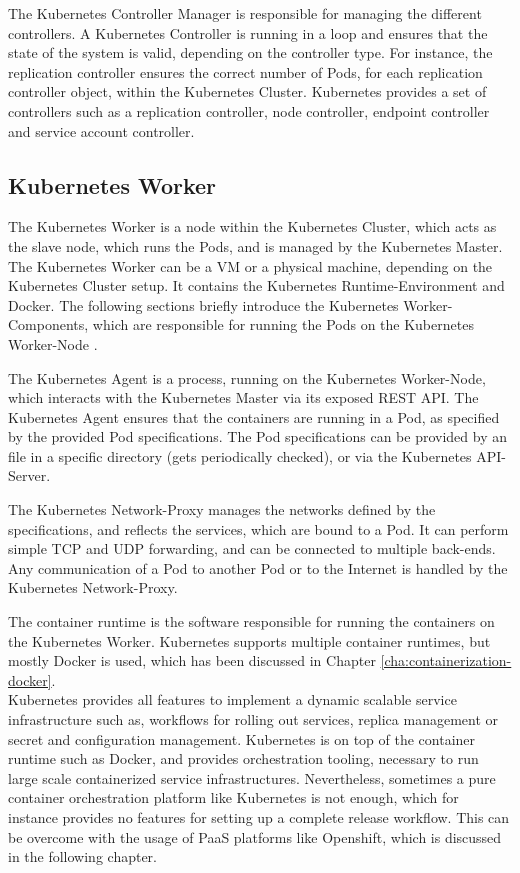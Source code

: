 The Kubernetes Controller Manager is responsible for managing the different controllers. A Kubernetes Controller is running in a loop and ensures that the state of the system is valid, depending on the controller type. For instance, the replication controller ensures the correct number of Pods, for each replication controller object, within the Kubernetes Cluster. Kubernetes provides a set of controllers such as a replication controller, node controller, endpoint controller and service account controller.

\subsection{Kubernetes Worker}
\label{sec:caas-kubernetes-worker}
The Kubernetes Worker is a node within the Kubernetes Cluster, which acts as the slave node, which runs the Pods, and is managed by the Kubernetes Master. The Kubernetes Worker can be a VM or a physical machine, depending on the Kubernetes Cluster setup. It contains the Kubernetes Runtime-Environment and Docker. The following sections briefly introduce the Kubernetes Worker-Components, which are responsible for running the Pods on the Kubernetes Worker-Node \cite{CNCFKubernetesComponents2018}. 

The Kubernetes Agent is a process, running on the Kubernetes Worker-Node, which interacts with the Kubernetes Master via its exposed REST API. The Kubernetes Agent ensures that the containers are running in a Pod, as specified by the provided Pod specifications. The Pod specifications can be provided by an file in a specific directory (gets periodically checked), or via the Kubernetes API-Server.

The Kubernetes Network-Proxy manages the networks defined by the specifications, and reflects the services, which are bound to a Pod. It can perform simple TCP and UDP forwarding, and can be connected to multiple back-ends. Any communication of a Pod to another Pod or to the Internet is handled by the Kubernetes Network-Proxy. 

The container runtime is the software responsible for running the containers on the Kubernetes Worker. Kubernetes supports multiple container runtimes, but mostly  Docker is used, which has been discussed in Chapter \vref{cha:containerization-docker}. \\

Kubernetes provides all features to implement a dynamic scalable service infrastructure such as, workflows for rolling out services, replica management or secret and configuration management. Kubernetes is on top of the container runtime such as Docker, and provides orchestration tooling, necessary to run large scale containerized service infrastructures. Nevertheless, sometimes a pure container orchestration platform like Kubernetes is not enough, which for instance provides no features for setting up a complete release workflow. This can be overcome with the usage of PaaS platforms like Openshift, which is discussed in the following chapter.
